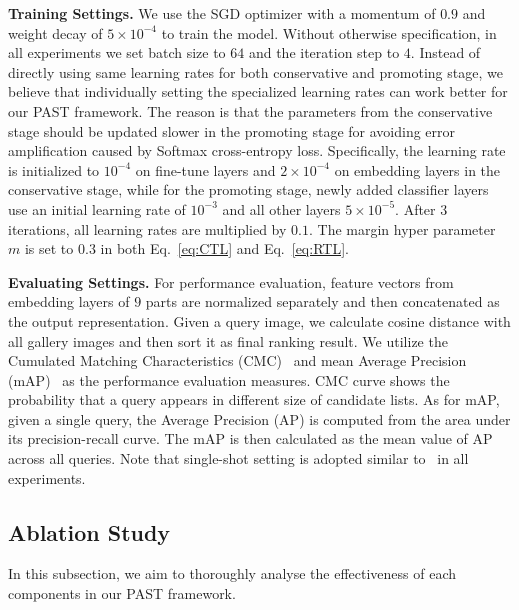 \documentclass[10pt,twocolumn,letterpaper]{article}
\begin{document}
\textbf{Training Settings.} We use the SGD optimizer with a momentum of $0.9$ and weight decay of $5\times10^{-4}$ to train the model. Without otherwise specification, in all experiments we set batch size to $64$ and the iteration step to $4$. 
Instead of directly using same learning rates for both conservative and promoting stage, we believe that individually setting the specialized learning rates can work better for our PAST framework. 
The reason is that the parameters from the conservative stage should be updated slower in the promoting stage for avoiding error amplification caused by Softmax cross-entropy loss. Specifically, the learning rate is initialized to $10^{-4}$ on fine-tune layers and $2\times10^{-4}$ on embedding layers in the conservative stage, while for the promoting stage, newly added classifier layers use an initial learning rate of $10^{-3}$ and all other layers $5\times10^{-5}$. 
After $3$ iterations, all learning rates are multiplied by $0.1$. The margin hyper parameter $m$ is set to $0.3$ in both Eq.~\eqref{eq:CTL} and Eq.~\eqref{eq:RTL}.

\textbf{Evaluating Settings.} For performance evaluation, feature vectors from embedding layers of $9$ parts are normalized separately and then concatenated as the output representation. Given a query image, we calculate cosine distance with all gallery images and then sort it as final ranking result. We utilize the Cumulated Matching Characteristics (CMC)~\cite{CMC} and mean Average Precision (mAP)~\cite{market1501} as the performance evaluation measures. CMC curve shows the probability that a query appears in different size of candidate lists. As for mAP, given a single query, the Average Precision (AP) is computed from the area under its precision-recall curve. The mAP is then calculated as the mean value of AP across all queries. Note that single-shot setting is adopted similar to~\cite{PCB} in all experiments. 

\subsection{Ablation Study}
In this subsection, we aim to thoroughly analyse the effectiveness of each components in our PAST framework.
\end{document}
